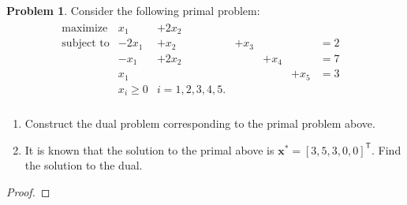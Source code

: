 \documentclass[12pt]{article}
\theoremstyle{definition}
\newtheorem{problem}{Problem}
\newcommand{\vc}[1]{\boldsymbol{#1}}
\newcommand{\tran}{\mathsf{T}}
\begin{document}
\begin{problem}
  Consider the following primal problem:
  \begin{align*}
    \begin{array}{rllllll}
      \text{maximize} & x_1 &+ 2x_2 & & & & \\
      \text{subject to} & -2x_1 &+ x_2 &+ x_3 & & &= 2 \\
      & -x_1 &+ 2x_2& &+ x_4 & &= 7 \\
      & x_1 &&& &+ x_5 &= 3 \\
      &x_i \geq 0 & i= 1,2,3,4,5.& & & \\
    \end{array}
    \begin{array}{ll}
    \end{array}
  \end{align*}
  \begin{enumerate}
    \item Construct the dual problem corresponding to the primal problem above.
    \item It is known that the solution to the primal above is $\vc{x}^{*} = [3,5,3,0,0]^\tran$.
      Find the solution to the dual.
  \end{enumerate}
\end{problem}

\begin{proof}
\end{proof}
\newpage
\end{document}
